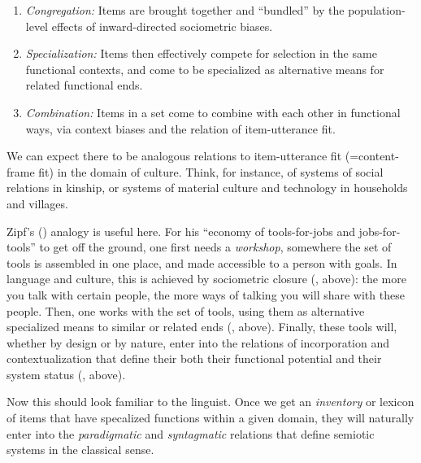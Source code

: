 \begin{enumerate}

\item {\textit{Congregation:} Items are brought together and ``bundled'' by the population-level effects of inward-directed sociometric biases.}

\item {\textit{Specialization:} Items then effectively compete for selection in the same functional contexts, and come to be specialized as alternative means for related functional ends.}
 \item {\textit{Combination:} Items in a set come to combine with each other in functional ways, via context biases and the relation of item-utterance fit.} 

\end{enumerate}

We can expect there to be analogous relations to 
item-utterance fit  (=content-frame fit) in the domain of culture. Think, for instance, of 
systems of social relations in kinship, or systems of material culture 
and technology in households and villages. 



Zipf's (\citeyear{zipf_human_1949}) analogy is useful here. For his ``economy of tools-for-jobs 
and jobs-for-tools'' to get off the ground, one first needs a \textit{workshop}, somewhere the set of tools is assembled in one place, 
and made accessible to a person with goals. In language and 
culture, this is achieved by sociometric closure (, above): the more you talk with certain people, the more ways of talking you will share with these people. 
Then, one works with the set of tools, using them as alternative specialized means to similar or related ends (, above). Finally, these tools will, whether 
by design or by nature, enter into the relations of incorporation and 
contextualization that define their both their functional potential and their system status (, 
above). 



Now this should look familiar to the linguist. Once we get an \textit{inventory} or lexicon of items that have specalized functions within a given domain, they will naturally enter into the 
\textit{paradigmatic} and \textit{syntagmatic} relations that 
define semiotic systems in the classical sense.









\newpage